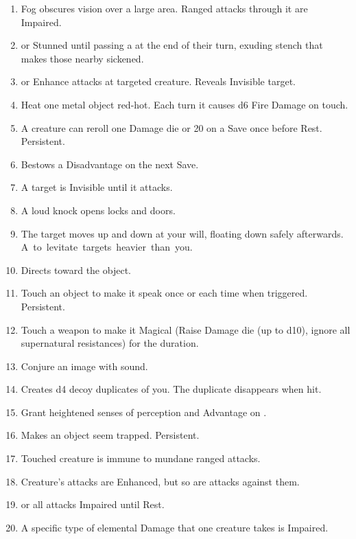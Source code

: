 \documentclass[itdr/core]{subfiles}
\begin{document}
\begin{enumerate}
	\item {} Fog obscures vision over a large area. Ranged attacks through it are Impaired.
	\item {}  or Stunned until passing a   at the end of their turn, exuding stench that makes those nearby sickened.
	\item {}  or Enhance attacks at targeted creature. Reveals Invisible target.
	\item {} Heat one metal object red-hot. Each turn it causes d6 Fire Damage on touch.
	\item {} A creature can reroll one Damage die or 20 on a Save once before Rest. Persistent.
	\item {} Bestows a Disadvantage on the next Save.
	\item {} A target is Invisible until it attacks.
	\item {} A loud knock opens locks and doors.
	\item {} The target moves up and down at your will, floating down safely afterwards. \mbox{A  to levitate targets heavier than you.}
	\item {} Directs toward the object.
	\item {} Touch an object to make it speak once or each time when triggered. Persistent.
	\item {} Touch a weapon to make it Magical (Raise Damage die (up to d10), ignore all supernatural resistances) for the duration.
	\item {} Conjure an image with sound.
	\item {} Creates d4 decoy duplicates of you. The duplicate disappears when hit.
	\item {} Grant heightened senses of perception and Advantage on .
	\item {} Makes an object seem trapped. Persistent.
	\item {} Touched creature is immune to mundane ranged attacks.
	\item {} Creature's attacks are Enhanced, but so are attacks against them.
	\item {}  or all attacks Impaired until Rest.
	\item {} A specific type of elemental Damage that one creature takes is Impaired.

\end{enumerate}
\end{document}
